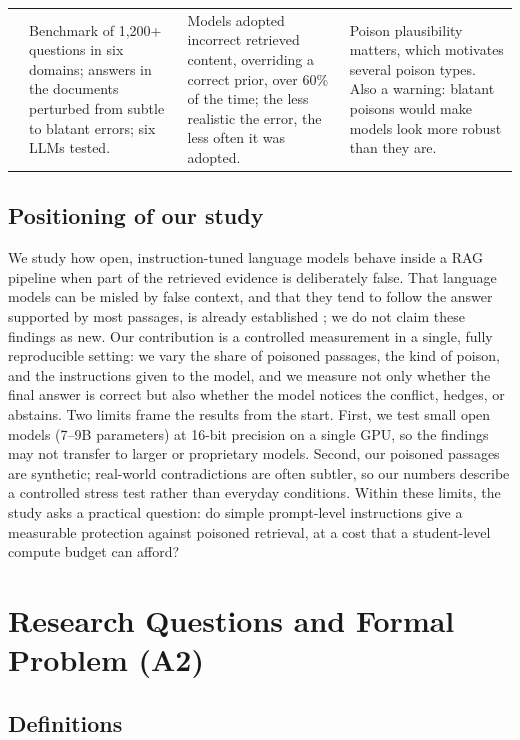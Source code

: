 \documentclass[11pt,a4paper]{report}
\begin{document}
{\begin{longtable}{
  >{\raggedright\arraybackslash}p{2.2cm}
  >{\raggedright\arraybackslash}p{3.9cm}
  >{\raggedright\arraybackslash}p{3.9cm}
  >{\raggedright\arraybackslash}p{4.2cm}}
\citet{wu2024clasheval}
& Benchmark of 1{,}200+ questions in six domains; answers in the documents
  perturbed from subtle to blatant errors; six LLMs tested.
& Models adopted incorrect retrieved content, overriding a correct prior,
  over 60\% of the time; the less realistic the error, the less often it
  was adopted.
& Poison plausibility matters, which motivates several poison types. Also a
  warning: blatant poisons would make models look more robust than they
  are. \\

\end{longtable}
}
\section{Positioning of our study}\label{sec:positioning}

We study how open, instruction-tuned language models behave inside a RAG
pipeline when part of the retrieved evidence is deliberately false.
That language models can be misled by false context, and that they tend to
follow the answer supported by most passages, is already established
\citep{jin2024tugofwar,wu2024clasheval}; we do not claim these findings as new.
Our contribution is a controlled measurement in a single, fully reproducible
setting: we vary the share of poisoned passages, the kind of poison, and the
instructions given to the model, and we measure not only whether the final
answer is correct but also whether the model notices the conflict, hedges,
or abstains.
Two limits frame the results from the start. First, we test small open models (7--9B parameters) at 16-bit precision on a single GPU, so the findings may not transfer to larger
or proprietary models. Second, our poisoned passages are synthetic; real-world
contradictions are often subtler, so our numbers describe a controlled stress
test rather than everyday conditions.
Within these limits, the study asks a practical question: do simple
prompt-level instructions give a measurable protection against poisoned
retrieval, at a cost that a student-level compute budget can afford?


\chapter{Research Questions and Formal Problem 
(A2)}\label{ch:rq}
\section{Definitions}\label{sec:definitions}
\end{document}
